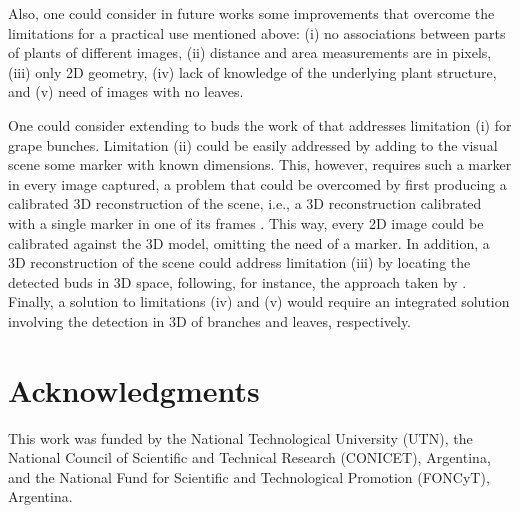\documentclass[a4paper,authoryear,review]{elsarticle}
\begin{document}
Also, one could consider in future works some improvements that overcome the limitations for a practical use mentioned above: (i) no associations between parts of plants of different images, (ii) distance and area measurements are in pixels, (iii) only 2D geometry, (iv) lack of knowledge of the underlying plant structure, and (v) need of images with no leaves.

One could consider extending to buds the work of \cite{santos2020grape} that addresses limitation (i) for grape bunches. 
%
Limitation (ii) could be easily addressed by adding to the visual scene some marker with known dimensions. This, however, requires such a marker in every image captured, a problem that could be overcomed by first producing a calibrated 3D reconstruction of the scene, i.e., a 3D reconstruction calibrated with a single marker in one of its frames \cite{hartley2003multiple, moons20093d}. This way, every 2D image could be calibrated against the 3D model, omitting the need of a marker. 
%
In addition, a 3D reconstruction of the scene could address limitation (iii) by locating the detected buds in 3D space, following, for instance, the approach taken by \cite{diaz2018grapevine}.
%
Finally, a solution to limitations (iv) and (v) would require an integrated solution involving the detection in 3D of branches and leaves, respectively. 



\section*{Acknowledgments}

This work was funded by the National Technological University (UTN), the National Council of Scientific and Technical Research (CONICET), Argentina, and the National Fund for Scientific and Technological Promotion (FONCyT), Argentina.


\end{document}
